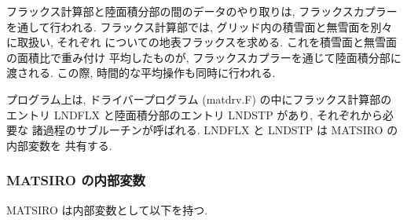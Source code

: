 フラックス計算部と陸面積分部の間のデータのやり取りは, フラックスカプラー
を通して行われる.
フラックス計算部では, グリッド内の積雪面と無雪面を別々に取扱い, それぞれ
についての地表フラックスを求める. これを積雪面と無雪面の面積比で重み付け
平均したものが, フラックスカプラーを通じて陸面積分部に渡される.
この際, 時間的な平均操作も同時に行われる.

プログラム上は, ドライバープログラム (matdrv.F) の中にフラックス計算部の
エントリ LNDFLX と陸面積分部のエントリ LNDSTP があり, それぞれから必要な
諸過程のサブルーチンが呼ばれる. LNDFLX と LNDSTP は MATSIRO の内部変数を
共有する.

\subsubsection{MATSIRO の内部変数}

MATSIRO は内部変数として以下を持つ.

